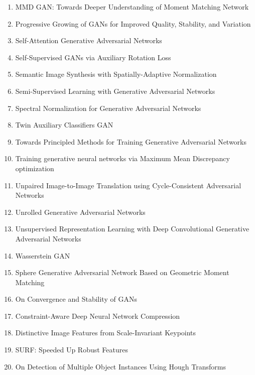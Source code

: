 \documentclass[acmlarge]{acmart}
\begin{document}
\begin{enumerate}
	\item MMD GAN: Towards Deeper Understanding of Moment Matching Network \cite{li2017mmd}
	\item Progressive Growing of GANs for Improved Quality, Stability, and Variation \cite{karras2017progressive}
	\item Self-Attention Generative Adversarial Networks \cite{zhang2018selfattention}
	\item Self-Supervised GANs via Auxiliary Rotation Loss \cite{chen2018selfsupervised}
	\item Semantic Image Synthesis with Spatially-Adaptive Normalization \cite{park2019semantic}
	\item Semi-Supervised Learning with Generative Adversarial Networks \cite{odena2016semisupervised}
	\item Spectral Normalization for Generative Adversarial Networks \cite{miyato2018spectral}
	\item Twin Auxiliary Classifiers GAN \cite{gong2019twin}
	\item Towards Principled Methods for Training Generative Adversarial Networks \cite{arjovsky2017principled}
	\item Training generative neural networks via Maximum Mean Discrepancy optimization \cite{dziugaite2015training}
	\item Unpaired Image-to-Image Translation using Cycle-Consistent Adversarial Networks \cite{zhu2017unpaired}
	\item Unrolled Generative Adversarial Networks \cite{metz2016unrolled}
	\item Unsupervised Representation Learning with Deep Convolutional Generative Adversarial Networks \cite{radford2015unsupervised}
	\item Wasserstein GAN \cite{arjovsky2017wasserstein}
	\item Sphere Generative Adversarial Network Based on Geometric Moment Matching \cite{Park2019SphereGA}
	\item On Convergence and Stability of GANs \cite{Kodali2018OnCA}
	\item Constraint-Aware Deep Neural Network Compression \cite{Chen2018ConstraintAwareDN}
	\item Distinctive Image Features from Scale-Invariant Keypoints \cite{LoweDavid2004DistinctiveIF}
	\item SURF: Speeded Up Robust Features \cite{Bay2006SURFSU}
	\item On Detection of Multiple Object Instances Using Hough Transforms \cite{Barinova2010OnDO}

\end{enumerate}
\end{document}
